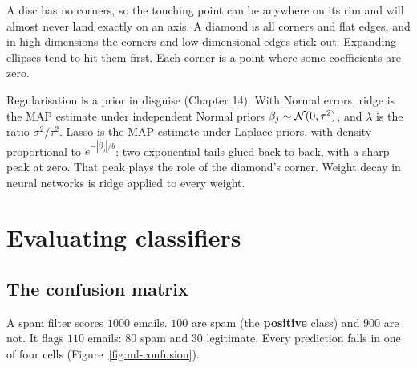 \begin{intuitionbox}
A disc has no corners, so the touching point can be anywhere on its rim and will almost never
land exactly on an axis. A diamond is all corners and flat edges, and in high dimensions the
corners and low-dimensional edges stick out. Expanding ellipses tend to hit them first. Each
corner is a point where some coefficients are zero.
\end{intuitionbox}

\begin{connectionbox}
Regularisation is a prior in disguise (Chapter 14). With Normal errors, ridge is the MAP
estimate under independent Normal priors $\beta_j\sim\mathcal{N}(0,\tau^2)$, and $\lambda$ is the
ratio $\sigma^2/\tau^2$. Lasso is the MAP estimate under Laplace priors, with density
proportional to $e^{-|\beta_j|/b}$: two exponential tails glued back to back, with a sharp peak
at zero. That peak plays the role of the diamond's corner.
Weight decay in neural networks is ridge applied to every weight.
\end{connectionbox}

\section{Evaluating classifiers}
\label{sec:ml-classify}

\subsection{The confusion matrix}

A spam filter scores $1000$ emails. $100$ are spam (the \textbf{positive} class) and $900$
are not. It flags $110$ emails: $80$ spam and $30$ legitimate. Every prediction falls in one
of four cells (Figure~\ref{fig:ml-confusion}).

